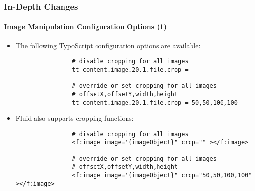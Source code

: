 \begin{frame}[fragile]
	\frametitle{In-Depth Changes}
	\framesubtitle{Image Manipulation Configuration Options (1)}

	\begin{itemize}
		\item The following TypoScript configuration options are available:
			\begin{lstlisting}
				# disable cropping for all images
				tt_content.image.20.1.file.crop =

				# override or set cropping for all images
				# offsetX,offsetY,width,height
				tt_content.image.20.1.file.crop = 50,50,100,100
			\end{lstlisting}

		\item Fluid also supports cropping functions:
			\begin{lstlisting}
				# disable cropping for all images
				<f:image image="{imageObject}" crop="" ></f:image>

				# override or set cropping for all images
				# offsetX,offsetY,width,height
				<f:image image="{imageObject}" crop="50,50,100,100" ></f:image>
			\end{lstlisting}

	\end{itemize}

\end{frame}

